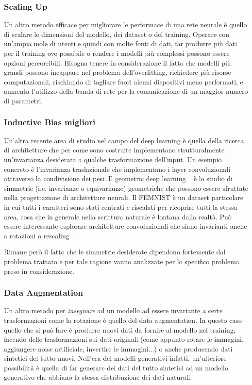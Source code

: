 \subsubsection{Scaling Up}
Un altro metodo efficace per migliorare le performace di una rete neurale 
è quello di scalare le dimensioni del modello, dei dataset o del training.
Operare con un'ampia mole di utenti e quindi con molte fonti di dati,
far produrre più dati per il training ove possibile o rendere i modelli 
più complessi possono essere opzioni percorribili. Bisogna tenere in 
considerazione il fatto che modelli più grandi possono incappare nel 
problema dell'overfitting, richiedere più risorse computazionali, 
rischiando di tagliare fuori alcuni dispositivi meno performati, e 
aumenta l'utilizzo della banda di rete per la comunicazione di un 
maggior numero di parametri.


\subsubsection{Inductive Bias migliori}
Un'altra recente area di studio nel campo del deep learning è quella 
della ricerca di architetture che per come sono costruite implementano
strutturalmente un'invarianza desiderata a qualche trasformazione 
dell'input. Un esempio concreto è l'invarianza traslazionale che 
implementano i layer convoluzionali attraverso la condivisione dei pesi.
Il geometric deep learning ~\cite{bronstein2021geometric} è lo studio di simmetrie 
(i.e. invarianze o equivarianze) geometriche che possono essere sfruttate nella 
progettazione di architetture neurali.
Il FEMNIST è un dataset particolare in cui tutti i caratteri sono stati
centrati e riscalati per ricoprire tutti la stessa area, cosa che in 
generale nella scrittura naturale è lontana dalla realtà. Può essere 
interessante esplorare architetture convoluzionali che siano invarianti 
anche a rotazioni o rescaling ~\cite{sosnovik2023symmetry, cohen2016group,
marcos2016rotation, cohen2016steer}.

Rimane però il fatto che le simmetrie desiderate dipendono fortemente 
dal problema trattato e per tale ragione vanno analizzate per lo 
specifico problema preso in considerazione.


\subsubsection{Data Augmentation}
Un altro metodo per \textit{insegnare} ad un modello ad essere invariante
a certe trasformazioni come la rotazione è quello del data augmentation.
In questo caso quello che si può fare è produrre nuovi dati da fornire
al modello nel training, facendo delle trasformazioni sui dati 
originali (come appunto rotare le immagini, aggiungere noise artificiale,
invertire le immagini...) o anche producendo dati sintetici del tutto
nuovi. Nell'era dei modelli generativi infatti, un'ulteriore possibilità
è quella di far generare dei dati del tutto sintetici ad un modello 
generativo che abbiano la stessa distribuzione dei dati naturali.

